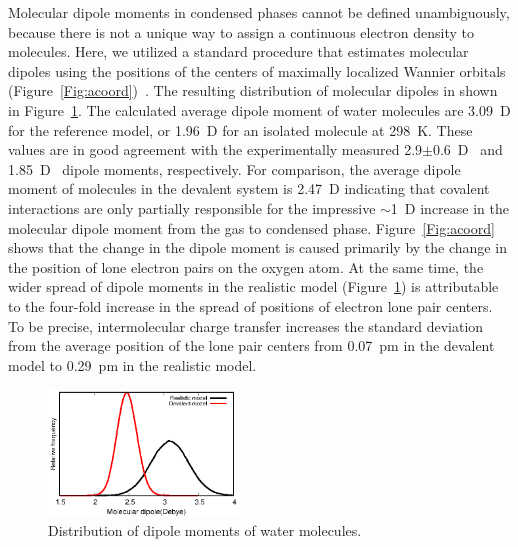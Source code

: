 \documentclass[aps,prl,reprint,amsmath,amssymb]{revtex4-1}
\begin{document}
Molecular dipole moments in condensed phases cannot be defined unambiguously, because there is not a unique way to assign a continuous electron density to molecules.
Here, we utilized a standard procedure that estimates molecular dipoles using the positions of the centers of maximally localized Wannier orbitals (Figure~\ref{Fig:acoord})~\cite{marzari1997maximally,sharma2007dipolar}. 
The resulting distribution of molecular dipoles in shown in Figure~\ref{Fig:dipoledist}.  
The calculated average dipole moment of water molecules are 3.09~D for the reference model, or 1.96~D for an isolated molecule at 298~K.
These values are in good agreement with the experimentally measured 2.9$\pm$0.6~D~\cite{badyal2000electron} and 1.85~D~\cite{haynes2014crc} dipole moments, respectively. 
For comparison, the average dipole moment of molecules in the devalent system is 2.47~D indicating that covalent interactions are only partially responsible for the impressive $\sim$1~D increase in the molecular dipole moment from the gas to condensed phase. 
Figure~\ref{Fig:acoord} shows that the change in the dipole moment is caused primarily by the change in the position of lone electron pairs on the oxygen atom. 
At the same time, the wider spread of dipole moments in the realistic model (Figure~\ref{Fig:dipoledist}) is attributable to the four-fold increase in the spread of positions of electron lone pair centers. 
To be precise, intermolecular charge transfer increases the standard deviation from the average position of the lone pair centers from 0.07~pm in the devalent model to 0.29~pm in the realistic model.
%

\begin{figure}
\includegraphics[width=0.45\textwidth]{new_dipole}
\caption{Distribution of dipole moments of water molecules.} \label{Fig:dipoledist}
\end{figure}
\end{document}
